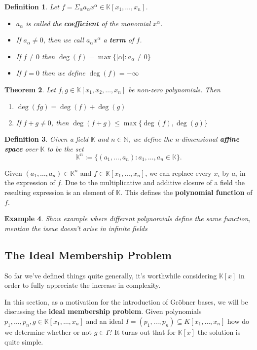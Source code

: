 \documentclass[a4paper,12pt]{article}
\newtheorem{theorem}{Theorem}[section]
\newtheorem{definition}[theorem]{Definition}
\newtheorem{example}[theorem]{Example}
\newcommand{\KK}{\mathbb{K}}
\newcommand{\NN}{\mathbb{N}}
\newcommand{\ind}[2]{#1_1,#1_2,\ldots,#1_#2}
\begin{document}
\begin{definition}
	Let $f = \Sigma_\alpha a_\alpha x^\alpha \in \KK[x_1, \ldots, x_n]$.
	\begin{itemize}
	\item $a_\alpha$ is called the \textbf{coefficient} of the monomial $x^\alpha$.	\item If $a_\alpha \neq 0$, then we call $a_\alpha x^\alpha$ a \textbf{term} of $f$.
	\item If $f \neq 0$ then $\deg(f) = \max\{ |\alpha| : a_\alpha \neq 0 \}$
	\item If $f = 0$ then we define $\deg(f) = -\infty$
	\end{itemize}
\end{definition}

\begin{theorem}\label{theo:deg}
	Let $ f,g\in \KK[\ind{x}{n}] $ be non-zero polynomials. Then
	\begin{enumerate}
		\item $\deg (fg) = \deg(f) + \deg(g)$
		\item If $ f + g \neq 0 $, then $ \deg(f+g) \leq \max\{\deg(f),\deg(g)\} $
	\end{enumerate}
\end{theorem}

\begin{definition}
	Given a field $\KK$ and $n \in \NN$, we define the n-dimensional \textbf{affine space} over $\KK$ to be the set
	$$
	\KK^n := \{ (a_1, \ldots, a_n) : a_1,\ldots, a_n \in \KK \}.
	$$
\end{definition}
Given $(a_1, \ldots, a_n) \in \KK^n$ and $f \in \KK[x_1, \ldots, x_n]$, we can replace every $x_i$ by $a_i$ in the expression of $f$. Due to the multiplicative and additive closure of a field the resulting expression is an element of $\KK$. This defines the \textbf{polynomial function} of $f$.
\begin{example}
	Show example where different polynomials define the same function, mention the issue doesn't arise in infinite fields
\end{example}

\subsection{The Ideal Membership Problem}
So far we've defined things quite generally, it's worthwhile considering $\KK[x]$ in order to fully appreciate the increase in complexity.

In this section, as a motivation for the introduction of Gr\"obner bases, we will be discussing the \textbf{ideal membership problem}. Given polynomials $p_1, \ldots, p_n, g \in \KK[x_1, \ldots, x_n]$ and an ideal $I = (p_1, \ldots, p_n) \subseteq K[x_1, \ldots, x_n]$ how do we determine whether or not $g \in I$? It turns out that for $\KK[x]$ the solution is quite simple.
\end{document}

